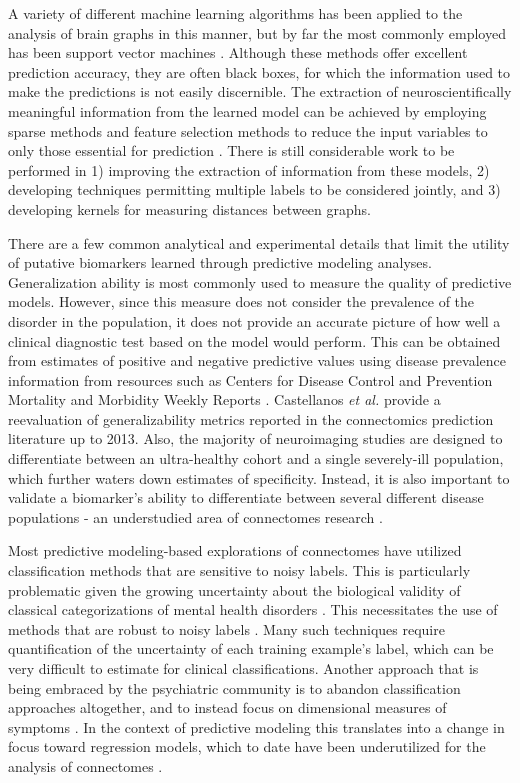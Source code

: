 \documentclass{bmcart}
\begin{document}
A variety of different machine learning algorithms has been applied to the analysis of brain graphs in this manner, but by far the most commonly employed has been support vector machines \cite{Vapnik1998,Castellanos2013}. Although these methods offer excellent prediction accuracy, they are often black boxes, for which the information used to make the predictions is not easily discernible. The extraction of neuroscientifically meaningful information from the learned model can be achieved by employing sparse methods \cite{Ryali2010} and feature selection methods \cite{Craddock2009} to reduce the input variables to only those essential for prediction \cite{Varoquaux2013}.  There is still considerable work to be performed in 1) improving the extraction of information from these models, 2) developing techniques permitting multiple labels to be considered jointly, and 3) developing kernels for measuring distances between graphs.

There are a few common analytical and experimental details that limit the utility of putative biomarkers learned through predictive modeling analyses. Generalization ability is most commonly used to measure the quality of predictive models. However, since this measure does not consider the prevalence of the disorder in the population, it does not provide an accurate picture of how well a clinical diagnostic test based on the model would perform. This can be obtained from estimates of positive and negative predictive values \cite{Grimes2002,Altman1994} using disease prevalence information from resources such as Centers for Disease Control and Prevention Mortality and Morbidity Weekly Reports \cite{CDCMMWR}. Castellanos \emph{et al.} provide a reevaluation of generalizability metrics reported in the connectomics prediction literature up to 2013. Also, the majority of neuroimaging studies are designed to differentiate between an ultra-healthy cohort and a single severely-ill population, which further waters down estimates of specificity. Instead, it is also important to validate a biomarker's ability to differentiate between several different disease populations - an understudied area of connectomes research \cite{Kapur2012}. 

Most predictive modeling-based explorations of connectomes have utilized classification methods that are sensitive to noisy labels. This is particularly problematic given the growing uncertainty about the biological validity of classical categorizations of mental health disorders \cite{Kapur2012}. This necessitates the use of methods that are robust to noisy labels \cite{Lugosi1992,Scott2013}. Many such techniques require quantification of the uncertainty of each training example's label, which can be very difficult to estimate for clinical classifications. Another approach that is being embraced by the psychiatric community is to abandon classification approaches altogether, and to instead focus on dimensional measures of symptoms \cite{Insel2010}. In the context of predictive modeling this translates into a change in focus toward regression models, which to date have been underutilized for the analysis of connectomes \cite{Castellanos2013}. 
\end{document}

